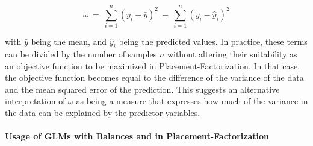 \begin{equation}
    \label{ch:Factorization:sub:GLM:eq:ObjectiveFunction}
    \omega %
    ~=~ \sum_{i=1}^{n} \left( y_i - \bar{y} \right)^2
    ~-~ \sum_{i=1}^{n} \left( y_i - \hat{y}_i \right)^2
\end{equation}

with $\bar{y}$ being the mean, and $\hat{y}_i$ being the predicted values.
In practice, these terms can be divided by the number of samples $n$
without altering their suitability as an objective function to be maximized in Placement-Factorization.
In that case, the objective function becomes equal to the difference of the variance of the data
and the mean squared error of the prediction.
This suggests an alternative interpretation of $\omega$ as being a measure
that expresses how much of the variance in the data can be explained by the predictor variables.




\paragraph{Usage of GLMs with Balances and in Placement-Factorization}
\label{ch:Factorization:sec:Methods:sub:GLMs:par:Balances}

